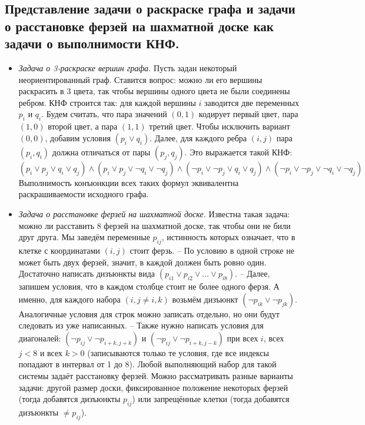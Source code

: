 \subsection{Представление задачи о раскраске графа и задачи о расстановке ферзей на шахматной доске как задачи о выполнимости КНФ.}
\begin{itemize}
    \item \textit{Задача о 3-раскраске вершин графа.} Пусть задан некоторый неориентированный граф. Ставится вопрос: можно ли его вершины раскрасить в 3 цвета, так чтобы
    вершины одного цвета не были соединены ребром. КНФ строится так: для каждой вершины $i$ заводится две переменных $p_i$ и $q_i$. Будем считать, что пара значений
    $(0, 1)$ кодирует первый цвет, пара $(1, 0)$ второй цвет, а пара $(1, 1)$ третий цвет. Чтобы исключить вариант $(0, 0)$, добавим условия $(p_i \lor q_i)$. Далее, для каждого
    ребра $(i, j)$ пара $(p_i, q_i)$ должна отличаться от пары $(p_j, q_j)$. Это выражается такой КНФ: $$(p_i\lor p_j \lor q_i \lor q_j )\land(p_i\lor p_j \lor \neg q_i \lor \neg q_j )\land (\neg p_i\lor \neg p_j\lor q_i\lor q_j )\land(\neg p_i\lor \neg p_j \lor \neg q_i \lor\neg q_j )$$
    Выполнимость конъюнкции всех таких формул эквивалентна раскрашиваемости исходного графа.
    
    \item \textit{Задача о расстановке ферзей на шахматной доске.} Известна такая задача: можно ли расставить $8$ ферзей на шахматной доске, так чтобы они не били друг друга. Мы заведём переменные $p_{ij}$, истинность которых означает, что в клетке с координатами $(i, j)$ стоит ферзь. 
    \newline -- По условию в одной строке не может быть двух ферзей, значит, в каждой должен быть ровно один. Достаточно написать дизъюнкты вида $(p_{i1} \lor p_{i2} \lor \ldots\lor p_{i8})$. \newline -- Далее, запишем условия, что в каждом столбце стоит не более одного ферзя. А именно, для каждого набора $(i, j \neq i, k)$ возьмём дизъюнкт $(\neg p_{ik} \lor \neg p_{jk})$. Аналогичные условия для строк можно записать отдельно, но они будут следовать из уже написанных. \newline -- Также нужно написать условия для диагоналей: $(\neg p_{ij} \lor \neg p_{i+k,j+k})$ и $(\neg p_{ij} \lor\neg p_{i+k,j-k})$ при всех $i$, всех $j < 8$ и всех $k> 0$ (записываются только те условия, где все индексы попадают в интервал от 1 до 8). \newline Любой выполняющий набор для такой системы задаёт расстановку ферзей. Можно рассматривать разные варианты задачи: другой размер доски, фиксированное положение некоторых ферзей (тогда добавятся дизъюнкты $p_{ij}$) или запрещённые клетки (тогда добавятся дизъюнкты $\neq p_{ij}$).
\end{itemize}

